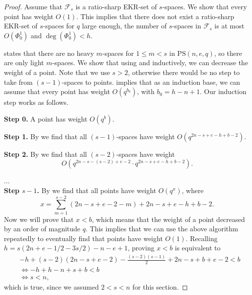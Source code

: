 \documentclass[11pt]{article}
\newcommand{\EKR}{\mathcal{F}}
\newcommand{\PS}{\mathrm{PS}}
\newcommand{\philipp}[1]{\textcolor{blue}{#1}}
\renewcommand{\leq}{\leqslant}
\begin{document}
\begin{proof}
Assume that $\EKR_s$ is a ratio-sharp EKR-set of $s$-spaces. We show that every point has weight $O(1)$. This implies that there does not exist a ratio-sharp EKR-set of $s$-spaces for $q$ large enough, the number of $s$-spaces in $\EKR_s$ is at most $O(\Phi_0^1)$ and $\deg(\Phi_0^1)<h$. 

 states that there are no heavy $m$-spaces for $1\leq m<s$  in $\PS(n,e,q)$, so there are only light $m$-spaces. We show that using  and  inductively, we can decrease the weight of a point. Note that we use $s>2$, otherwise there would be no step to take from $(s-1)$-spaces to points. 
 implies that as an induction base, we can assume that every point has weight $O(q^{b_0})$, with $b_0=h-n+1$. Our induction step works as follows.
 
\textbf{Step 0.} A point has weight $O(q^{b})$. 

\textbf{Step 1.} By  we find that all $(s-1)$-spaces have weight $O(q^{2n-s+e-h+b-2})$. 

\textbf{Step 2.} By  we find that all $(s-2)$-spaces have weight $$O(q^{2n-s-(s-2)+e-2} \cdot q^{2n-s+e-h+b-2}).$$

$\dots$ \\

\textbf{Step $s-1$.} By  we find that all points have weight $O(q^x)$, where 
\[x = \sum_{m=1}^{s-2}(2n-s+e-2-m)+2n-s+e-h+b-2.\]
Now we will prove that $x < b$, which means that the weight of a point decreased by an order of magnitude $q$.
This implies that we can use the above algorithm repeatedly to eventually find that points have weight $O(1)$.
Recalling $h = s(2n+e-1/2-3s/2)-n-e+1$, proving $x<b$ is equivalent to 
\begin{align*}
    & -h + (s - 2) (2n-s+e-2)- \frac{(s-2)(s-1)}{2} + 2 n - s + b + e - 2< b \\
    &\Leftrightarrow -h + h-n+s +b<b\\
    & \Leftrightarrow s<n,
\end{align*}
which is true, since we assumed $2<s<n$ for this section.
\end{proof}
\end{document}
